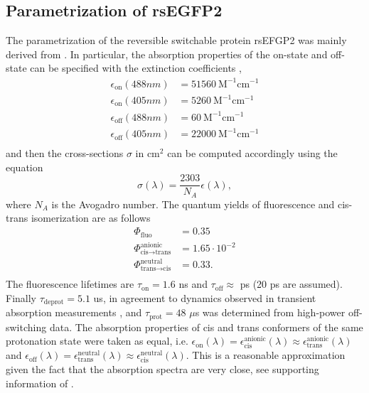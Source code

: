 \documentclass{article}
\begin{document}
\subsection{Parametrization of rsEGFP2}\label{sec:rs2_parametrization}
The parametrization of the reversible switchable protein rsEFGP2 was mainly derived from \cite{Khatib2016}.
In particular, the absorption properties of the on-state and off-state can be specified with the extinction coefficients \cite{Khatib2016},
\begin{equation}
    \begin{aligned}
        \epsilon_{\text{on}} (488 nm) &= 51560 \ \text{M}^{-1} \text{cm}^{-1} \\
        \epsilon_{\text{on}} (405 nm) &= 5260 \ \text{M}^{-1} \text{cm}^{-1} \\
        \epsilon_{\text{off}} (488 nm) &= 60 \ \text{M}^{-1} \text{cm}^{-1} \\
        \epsilon_{\text{off}} (405 nm) &= 22000 \ \text{M}^{-1} \text{cm}^{-1} \\
    \end{aligned}
\end{equation}
and then the cross-sections $\sigma$ in cm$^2$ can be computed accordingly using the equation \cite{TkachenkoBook}
\begin{equation}
    \sigma(\lambda) = \frac{2303}{N_A}\epsilon(\lambda),
\end{equation}
where $N_A$ is the Avogadro number.
The quantum yields of fluorescence and cis-trans isomerization are as follows \cite{Khatib2016}
\begin{equation}
    \begin{aligned}
        \Phi_\text{fluo} &= 0.35 \\
        \Phi^{\text{anionic}}_{\text{cis} \rightarrow \text{trans}} &= 1.65 \cdot 10^{-2} \\
        \Phi^{\text{neutral}}_{\text{trans} \rightarrow \text{cis}} &= 0.33. \\
    \end{aligned}
\end{equation}
The fluorescence lifetimes are $\tau_\text{on} = 1.6$ ns \cite{Testa2015} and $\tau_\text{off} \approx$ ps \cite{Woodhouse2020} (20 ps are assumed). Finally $\tau_\text{deprot} = 5.1$ us, in agreement to dynamics observed in transient absorption measurements \cite{Woodhouse2020}, and $\tau_\text{prot} = 48$ $\mu$s was determined from high-power off-switching data.
The absorption properties of cis and trans conformers of the same protonation state were taken as equal, i.e. $\epsilon_\text{on}(\lambda) = \epsilon_\text{cis}^\text{anionic}(\lambda) \approx \epsilon_\text{trans}^\text{anionic}(\lambda)$ and $\epsilon_\text{off}(\lambda) = \epsilon_\text{trans}^\text{neutral}(\lambda) \approx \epsilon_\text{cis}^\text{neutral}(\lambda)$. This is a reasonable approximation given the fact that the absorption spectra are very close, see supporting information of \cite{Woodhouse2020}.
\end{document}
